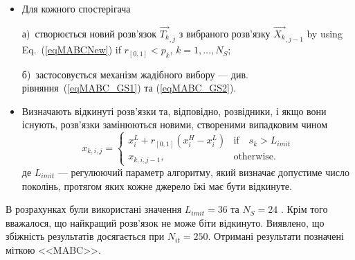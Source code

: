 \begin{itemize}[leftmargin=0cm,itemindent=1em]
 \item Для кожного спостерігача

 а)~створюється новий розв'язок $\overrightarrow{T_{k}}_{,j}$ з вибраного розв'язку
$\overrightarrow{X_{k}}_{,j-1}$ by using Eq.~(\ref{eqMABCNew}) if $r_{[0,1]}<p_k$, $k={1,\ldots,N_S}$;

 б)~застосовується механізм жадібного вибору --- див. рівняння~(\ref{eqMABC_GS1}) та (\ref{eqMABC_GS2}).

 \item
 Визначають відкинуті розв'язки та, відповідно, розвідники, і якщо вони існують, розв'язки замінюються новими, створеними випадковим чином
  \begin{equation}
 \label{eqMABCSC}
 x_{k,i,j}=\left\{
 \begin{array}{ll}
 x_i^L+r_{[0,1]}(x_i^H-x_i^L) & \text{if} \quad s_k>L_{imit}
 \\
 x_{k,i,j-1},& \text{otherwise}.
 \end{array}
 \right.
 \end{equation}
 де
 $L_{imit}$ --- регулюючий параметр алгоритму, який визначає допустиме число поколінь, протягом яких кожне джерело їжі має бути відкинуте.
\end{itemize}

В розрахунках були використані значення $L_{imit}=36$ та $N_S=24$ \cite{MABC}.
Крім того вважалося, що найкращий розв'язок не може біти відкинуто.
Виявлено, що збіжність результатів досягається при $N_{it}=250$.
Отримані результати позначені міткою <<MABC>>.

